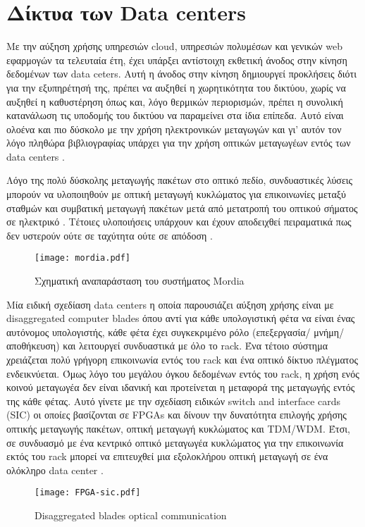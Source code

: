 \section{Δίκτυα των Data centers}

Με την αύξηση χρήσης υπηρεσιών cloud, υπηρεσιών πολυμέσων και
γενικών web εφαρμογών τα τελευταία έτη, έχει υπάρξει αντίστοιχη
εκθετική άνοδος στην κίνηση δεδομένων των data ceters. Αυτή η άνοδος
στην κίνηση δημιουργεί προκλήσεις διότι για την εξυπηρέτησή της,
πρέπει να αυξηθεί η χωρητικότητα του δικτύου, χωρίς να αυξηθεί η
καθυστέρηση όπως και, λόγο θερμικών περιορισμών, πρέπει η συνολική
κατανάλωση τις υποδομής του δικτύου να παραμείνει στα ίδια
επίπεδα. Αυτό είναι ολοένα και πιο δύσκολο με την χρήση ηλεκτρονικών
μεταγωγών και γι' αυτόν τον λόγο πληθώρα βιβλιογραφίας υπάρχει για την
χρήση οπτικών μεταγωγέων εντός των data centers \cite{6129370}.

Λόγο της πολύ δύσκολης μεταγωγής πακέτων στο οπτικό πεδίο,
συνδυαστικές λύσεις μπορούν να υλοποιηθούν με οπτική μεταγωγή
κυκλώματος για επικοινωνίες μεταξύ σταθμών και συμβατική μεταγωγή
πακέτων μετά από μετατροπή του οπτικού σήματος σε ηλεκτρικό
\cite{6533163} \cite{Helios}. Τέτοιες υλοποιήσεις
υπάρχουν και έχουν αποδειχθεί πειραματικά πως δεν υστερούν ούτε σε
ταχύτητα ούτε σε απόδοση \cite{6533163}.

\begin{figure}[H]
  \centering
  \texttt{[image: mordia.pdf]}
  \caption{Σχηματική αναπαράσταση του συστήματος Mordia}
  \label{fig:mordia}
\end{figure}

Μία ειδική σχεδίαση data centers η οποία παρουσιάζει αύξηση χρήσης
είναι με disaggregated computer blades όπου αντί για κάθε υπολογιστική
φέτα να είναι ένας αυτόνομος υπολογιστής, κάθε φέτα έχει συγκεκριμένο
ρόλο (επεξεργασία/ μνήμη/ αποθήκευση) και λειτουργεί συνδυαστικά με
όλο το rack. Ένα τέτοιο σύστημα χρειάζεται πολύ γρήγορη επικοινωνία
εντός του rack και ένα οπτικό δίκτυο πλέγματος ενδεικνύεται. Όμως λόγο
του μεγάλου όγκου δεδομένων εντός του rack, η χρήση ενός κοινού
μεταγωγέα δεν είναι ιδανική και προτείνεται η μεταφορά της μεταγωγής
εντός της κάθε φέτας. Αυτό γίνετε με την σχεδίαση ειδικών switch and
interface cards (SIC) οι οποίες βασίζονται σε FPGAs και δίνουν την
δυνατότητα επιλογής χρήσης οπτικής μεταγωγής πακέτων, οπτική μεταγωγή
κυκλώματος και TDM/WDM. Έτσι, σε συνδυασμό με ένα κεντρικό οπτικό
μεταγωγέα κυκλώματος για την επικοινωνία εκτός του rack μπορεί να
επιτευχθεί μια εξολοκλήρου οπτική μεταγωγή σε ένα ολόκληρο data
center \cite{7383226}.

\begin{figure}[H]
  \centering
  \texttt{[image: FPGA-sic.pdf]}
  \caption{Disaggregated blades optical communication}
  \label{fig:sic}
\end{figure}

 
